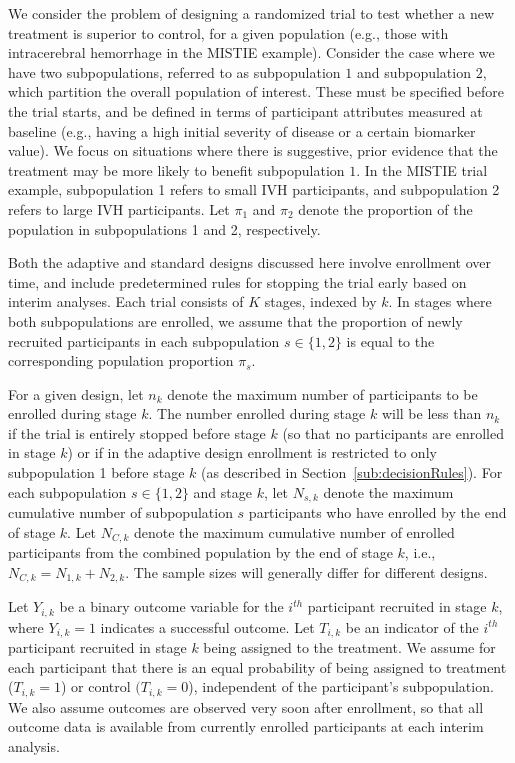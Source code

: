 \documentclass[article]{jss}
\begin{document}
We consider the problem of designing a randomized trial to test whether a new treatment is superior to control, for a given population (e.g., those with intracerebral hemorrhage in  the MISTIE example).
Consider the case where we have two subpopulations, referred to as subpopulation $1$ and subpopulation $2$, which partition the overall population of interest. These must be specified before the trial starts, and be defined in terms of participant attributes measured at baseline (e.g., having a high initial severity of disease or a certain biomarker value). 
We focus on situations where  there is suggestive, prior evidence that the treatment may be more likely to benefit subpopulation $1$.
In the MISTIE trial example, subpopulation 1 refers to small IVH participants, and subpopulation 2 refers to large IVH participants. 
Let $π_1$ and $π_2$ denote the proportion of the population in subpopulations 1 and 2, respectively.

Both the adaptive and standard designs discussed here involve enrollment over time, and include predetermined rules for stopping the trial early based on interim analyses. Each trial consists of $K$ stages, indexed by $k$. 
In stages where both subpopulations are enrolled, we assume that the proportion of newly recruited participants  in each subpopulation $s \in \{1,2\}$ is equal to the corresponding population proportion $\pi_s$.

For a given design, let $n_k$ denote the maximum number of participants to be enrolled during stage $k$. The number enrolled during stage $k$ will be less than $n_k$ if the trial is entirely stopped before stage $k$ (so that no participants are enrolled in stage $k$) or if in the adaptive design enrollment is restricted to only subpopulation 1 before stage $k$ (as described in Section~\ref{sub:decisionRules}). For each subpopulation $s \in \{1,2\}$ and stage $k$, let $N_{s,k}$ denote the maximum cumulative number of subpopulation $s$ participants who have enrolled by the end of stage $k$. Let $N_{C,k}$ denote the maximum cumulative number of enrolled participants from the combined population by the end of stage $k$, i.e.,  $N_{C,k}=N_{1,k}+N_{2,k}$.
The sample sizes will generally differ for different designs.

Let $Y_{i,k}$ be a binary outcome variable for the $i^{th}$ participant recruited in stage $k$, where $Y_{i,k}=1$ indicates a successful outcome. Let $T_{i,k}$ be an indicator of   the $i^{th}$ participant recruited in stage $k$ being assigned to the treatment. We assume for each participant that there is an equal probability of being assigned to  treatment ($T_{i,k}=1$) or control $(T_{i,k}=0$), independent of the participant's subpopulation. We also assume outcomes are observed very soon after enrollment, so that all outcome data is available from currently enrolled participants at each interim analysis.
\end{document}
